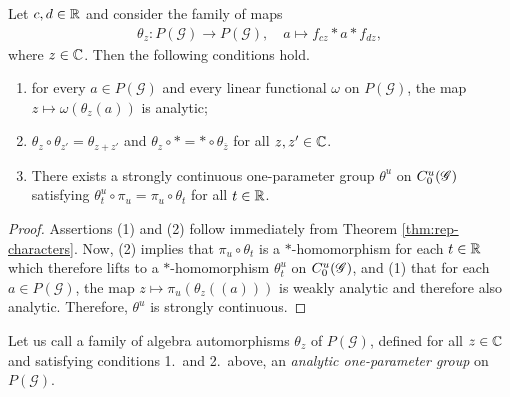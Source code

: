 \begin{Lem}\label{lem:analytic}
  Let $c,d \in \mathbb{R}$ and consider the family of maps
  \begin{align*}
    \theta_{z} \colon P(\mathscr{G})\to P(\mathscr{G}), \quad a\mapsto f_{cz} \ast a \ast f_{dz},
  \end{align*}
where $z\in \mathbb{C}$.  Then the following conditions hold.
  \begin{enumerate}
  \item for every $a\in P(\mathscr{G})$ and every linear
    functional $\omega$ on $P(\mathscr{G})$, the map $z\mapsto
    \omega(\theta_{z}(a))$ is analytic;
  \item $\theta_{z}\circ \theta_{z'} = \theta_{z+z'}$ and
    $\theta_{z}\circ \ast = \ast \circ \theta_{\overline{z}}$ for all
    $z,z' \in \mathbb{C}$.
  \item There exists a strongly continuous one-parameter group $\theta^{u}$ on $C^{u}_{0}(\mathscr{G})$ satisfying $\theta^{u}_{t} \circ \pi_{u} = \pi_{u} \circ \theta_{t}$ for all $t\in \mathbb{R}$. 
  \end{enumerate}
\end{Lem}
\begin{proof}
Assertions (1) and (2)   follow immediately from  Theorem \ref{thm:rep-characters}. Now, (2) implies that $\pi_{u}\circ \theta_{t}$ is a $*$-homomorphism for each $t\in \mathbb{R}$ which therefore lifts to a $*$-homomorphism $\theta^{u}_{t}$ on $C^{u}_{0}(\mathscr{G})$, and (1) that for each $a\in P(\mathscr{G})$, the map $z\mapsto \pi_{u}(\theta_{z}((a)))$ is weakly analytic and therefore also analytic. Therefore, $\theta^{u}$ is strongly continuous.
\end{proof}
Let us call a family of algebra automorphisms $\theta_{z}$ of $P(\mathscr{G})$, defined for all $z\in \mathbb{C}$ and satisfying conditions 1.\ and 2.\ above,  an \emph{analytic one-parameter group} on $P(\mathscr{G})$.

